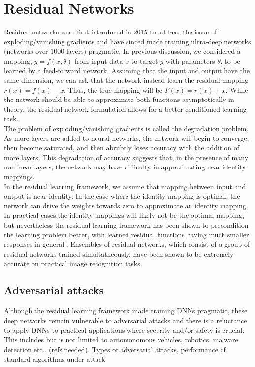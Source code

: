 \documentclass[12pt]{article}
\begin{document}
\section{Residual Networks}
Residual networks were first introduced in 2015 to address the issue of exploding/vanishing gradients and have sinced made training ultra-deep networks (networks over 1000 layers) pragmatic. In previous discussion, we considered a mapping, $y = f(x,\theta)$ from input data $x$ to target $y$ with parameters $\theta$, to be learned by a feed-forward network. Assuming that the input and output have the same dimension, we can ask that the network instead learn the residual mapping $r(x) = f(x)-x$. Thus, the true mapping will be $F(x) = r(x) + x$. While the network should be able to approximate both functions asymptotically in theory, the residual network formulation allows for a better conditioned learning task. \\
\indent The problem of exploding/vanishing gradients is called the degradation problem. As more layers are added to neural networks, the network will begin to converge, then become saturated, and then abrubtly loses accuracy with the addition of more layers. This degradation of accuracy suggests that, in the presence of many nonlinear layers, the network may have difficulty in approximating near identity mappings. \\
\indent In the residual learning framework, we assume that mapping between input and output is near-identity. In the case where the identity mapping is optimal, the network can drive the weights towards zero to approximate an identity mapping. In practical cases,the identity mappings will likely not be the optimal mapping, but nevertheless the residual learning framework has been shown to precondition the learning problem better, with learned residual functions having much smaller responses in general \cite{res}. Ensembles of residual networks, which consist of a group of residual networks trained simultatneously, have been shown to be extremely accurate on practical image recognition tasks.
\subsection{Adversarial attacks}
Although the residual learning framework made training DNNs pragmatic, these deep networks remain vulnerable to adversarial attacks and there is a reluctance to apply DNNs to practical applications where security and/or safety is crucial. This includes but is not limited to automonomous vehicles, robotics, malware detection etc.. (refs needed).
Types of adversarial attacks, performance of standard algorithms under attack
\end{document}
